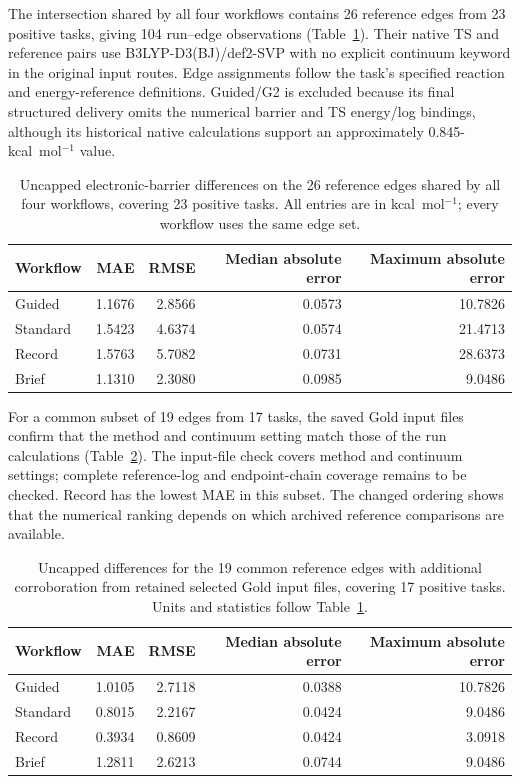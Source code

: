 The intersection shared by all four workflows contains 26 reference edges from 23 positive tasks, giving 104 run--edge observations (Table~\ref{tab:si-uncapped-common}). Their native TS and reference pairs use B3LYP-D3(BJ)/def2-SVP with no explicit continuum keyword in the original input routes. Edge assignments follow the task's specified reaction and energy-reference definitions. Guided/G2 is excluded because its final structured delivery omits the numerical barrier and TS energy/log bindings, although its historical native calculations support an approximately 0.845-kcal~mol$^{-1}$ value.

\begin{table}[!htbp]
\centering
\small
\caption{Uncapped electronic-barrier differences on the 26 reference edges shared by all four workflows, covering 23 positive tasks. All entries are in kcal~mol$^{-1}$; every workflow uses the same edge set.}
\label{tab:si-uncapped-common}
\begin{tabular}{lrrrr}
\toprule
Workflow & MAE & RMSE & Median absolute error & Maximum absolute error \\
\midrule
Guided & 1.1676 & 2.8566 & 0.0573 & 10.7826 \\
Standard & 1.5423 & 4.6374 & 0.0574 & 21.4713 \\
Record & 1.5763 & 5.7082 & 0.0731 & 28.6373 \\
Brief & 1.1310 & 2.3080 & 0.0985 & 9.0486 \\
\bottomrule
\end{tabular}
\end{table}

For a common subset of 19 edges from 17 tasks, the saved Gold input files confirm that the method and continuum setting match those of the run calculations (Table~\ref{tab:si-uncapped-gold-input}). The input-file check covers method and continuum settings; complete reference-log and endpoint-chain coverage remains to be checked. Record has the lowest MAE in this subset. The changed ordering shows that the numerical ranking depends on which archived reference comparisons are available.

\begin{table}[!htbp]
\centering
\small
\caption{Uncapped differences for the 19 common reference edges with additional corroboration from retained selected Gold input files, covering 17 positive tasks. Units and statistics follow Table~\ref{tab:si-uncapped-common}.}
\label{tab:si-uncapped-gold-input}
\begin{tabular}{lrrrr}
\toprule
Workflow & MAE & RMSE & Median absolute error & Maximum absolute error \\
\midrule
Guided & 1.0105 & 2.7118 & 0.0388 & 10.7826 \\
Standard & 0.8015 & 2.2167 & 0.0424 & 9.0486 \\
Record & 0.3934 & 0.8609 & 0.0424 & 3.0918 \\
Brief & 1.2811 & 2.6213 & 0.0744 & 9.0486 \\
\bottomrule
\end{tabular}
\end{table}

